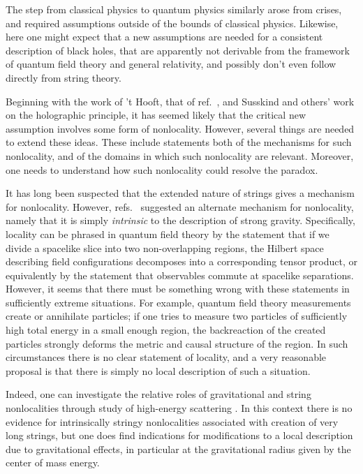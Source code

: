 
The step from classical physics to quantum physics similarly arose from crises, and required assumptions outside of the bounds of classical physics.  Likewise, here one might expect that a new assumptions are needed for a consistent description of black holes, that are apparently not derivable from the framework of quantum field theory and general relativity, and possibly don't even follow directly from string theory.

Beginning with the work of 't Hooft, that of ref.~\BHMR, and  Susskind and others' work on the holographic principle, it has seemed likely that the critical new assumption involves some form of nonlocality.  However, several things are needed to extend these ideas.  These include statements both of the mechanisms for such nonlocality, and of the domains in which such nonlocality are relevant.  Moreover, one needs to understand how such nonlocality could resolve the paradox.

It has long been suspected that the extended nature of strings gives a mechanism for nonlocality.  However, refs.~ suggested an alternate mechanism for nonlocality, namely that it is simply {\it intrinsic} to the description of strong gravity.  Specifically, locality can be phrased in quantum field theory by the statement that if we divide a spacelike slice into two non-overlapping regions, the Hilbert space describing field configurations decomposes into a corresponding tensor product, or equivalently by the statement that observables commute at spacelike separations.  However, it seems that there must be something wrong with these statements in sufficiently extreme situations.  For example, quantum field theory measurements create or annihilate particles; if one tries to measure two particles of sufficiently high total energy in a small enough region, the backreaction of the created particles strongly deforms the metric and causal structure of the region.  In such circumstances there is no clear statement of locality, and a very reasonable proposal  is that there is simply no local description of such a situation.

Indeed, one can investigate the relative roles of gravitational and string nonlocalities through study of high-energy scattering
.  In this context there is no evidence for intrinsically stringy nonlocalities associated with creation of very long strings, but one does find indications for modifications to a local description due to gravitational effects,  in particular at the gravitational radius given by the center of mass energy.

